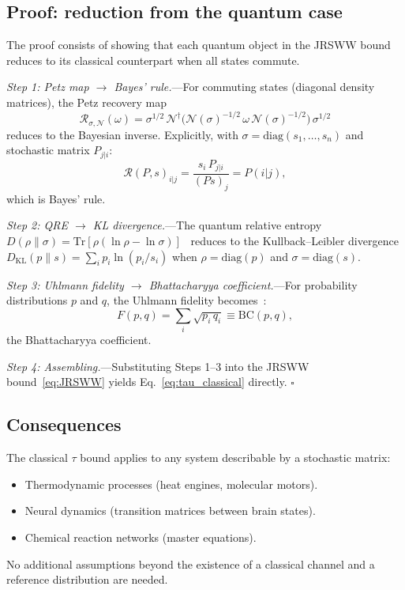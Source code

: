 \documentclass[prl,twocolumn,superscriptaddress,longbibliography,floatfix]{revtex4-2}
\newcommand{\Tr}{\mathrm{Tr}}
\newcommand{\Petz}{\mathcal{R}}
\newcommand{\chan}{\mathcal{N}}
\newcommand{\tauasym}{\tau}
\newcommand{\BC}{\mathrm{BC}}
\begin{document}
\subsection{Proof: reduction from the quantum case}

The proof consists of showing that each quantum object in the JRSWW
bound reduces to its classical counterpart when all states commute.

\emph{Step 1: Petz map $\to$ Bayes' rule.}---For commuting
states (diagonal density matrices), the Petz recovery
map~\cite{Petz1988,Parzygnat2023}
\begin{equation}
\Petz_{\sigma,\chan}(\omega) = \sigma^{1/2}\,
\chan^\dagger\!\bigl(\chan(\sigma)^{-1/2}\,\omega\,
\chan(\sigma)^{-1/2}\bigr)\,\sigma^{1/2}
\label{eq:petz_map}
\end{equation}
reduces to the Bayesian inverse. Explicitly, with
$\sigma = \mathrm{diag}(s_1,\ldots,s_n)$ and stochastic matrix
$P_{j|i}$:
\begin{equation}
\Petz(P,s)_{i|j}
= \frac{s_i\, P_{j|i}}{(Ps)_j}
= P(i|j),
\label{eq:bayes}
\end{equation}
which is Bayes' rule.

\emph{Step 2: QRE $\to$ KL divergence.}---The quantum relative
entropy $D(\rho\|\sigma)
= \Tr[\rho(\ln\rho - \ln\sigma)]$~\cite{Umegaki1962} reduces to
the Kullback--Leibler divergence
$D_{\mathrm{KL}}(p\|s) = \sum_i p_i \ln(p_i/s_i)$
when $\rho = \mathrm{diag}(p)$ and $\sigma = \mathrm{diag}(s)$.

\emph{Step 3: Uhlmann fidelity $\to$ Bhattacharyya
coefficient.}---For probability distributions $p$ and $q$,
the Uhlmann fidelity becomes~\cite{Uhlmann1976}:
\begin{equation}
F(p,q) = \sum_i \sqrt{p_i\, q_i} \equiv \BC(p,q),
\label{eq:BC}
\end{equation}
the Bhattacharyya coefficient.

\emph{Step 4: Assembling.}---Substituting Steps 1--3 into the
JRSWW bound~\eqref{eq:JRSWW} yields Eq.~\eqref{eq:tau_classical}
directly. \hfill$\square$

\subsection{Consequences}

The classical $\tauasym$ bound applies to any system
describable by a stochastic matrix:
\begin{itemize}
\item Thermodynamic processes (heat engines, molecular motors).
\item Neural dynamics (transition matrices between brain states).
\item Chemical reaction networks (master equations).
\end{itemize}
No additional assumptions beyond the existence of a classical
channel and a reference distribution are needed.
\end{document}
